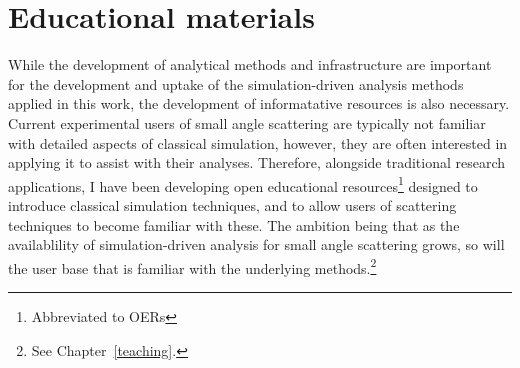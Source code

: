 \section{Educational materials}
While the development of analytical methods and infrastructure are important for the development and uptake of the simulation-driven analysis methods applied in this work, the development of informatative resources is also necessary.
Current experimental users of small angle scattering are typically not familiar with detailed aspects of classical simulation, however, they are often interested in applying it to assist with their analyses.
Therefore, alongside traditional research applications, I have been developing open educational resources\footnote{Abbreviated to OERs} designed to introduce classical simulation techniques, and to allow users of scattering techniques to become familiar with these.
The ambition being that as the availablility of simulation-driven analysis for small angle scattering grows, so will the user base that is familiar with the underlying methods.\footnote{See Chapter~\ref{teaching}.}
